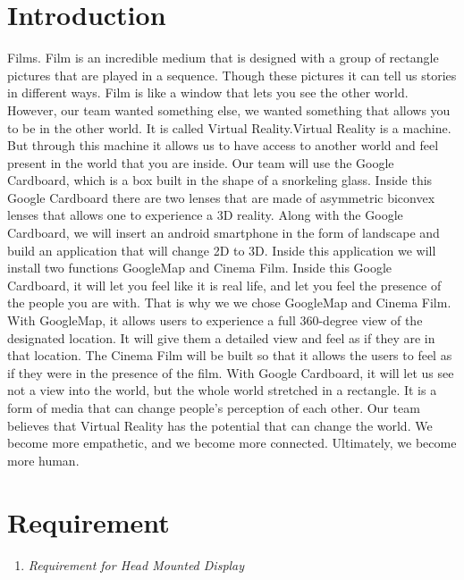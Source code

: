 \documentclass{article}
\begin{document}
\textbf{\textit{}}


\section{ Introduction}

\noindent Films. Film is an incredible medium that is designed with a group of rectangle pictures that are played in a sequence. Though these pictures it can tell us stories in different ways. Film is like a window that lets you see the other world. However, our team wanted something else, we wanted something that allows you to be in the other world. It is called Virtual Reality.Virtual Reality is a machine. But through this machine it allows us to have access to another world and feel present in the world that you are inside. Our team will use the Google Cardboard, which is a box built in the shape of a snorkeling glass. Inside this Google Cardboard there are two lenses that are made of asymmetric biconvex lenses that allows one to experience a 3D reality. Along with the Google Cardboard, we will insert an android smartphone in the form of landscape and build an application that will change 2D to 3D. Inside this application we will install two functions GoogleMap and Cinema Film. Inside this Google Cardboard, it will let you feel like it is real life, and let you feel the presence of the people you are with. That is why we we chose GoogleMap and Cinema Film. With GoogleMap, it allows users to experience a full 360-degree view of the designated location. It will give them a detailed view and feel as if they are in that location. The Cinema Film will be built so that it allows the users to feel as if they were in the presence of the film. With Google Cardboard, it will let us see not a view into the world, but the whole world stretched in a rectangle. It is a form of media that can change people's perception of each other. Our team believes that Virtual Reality has the potential that can change the world. We become more empathetic, and we become more connected. Ultimately, we become more human.


\section{ Requirement}

\noindent 

\begin{enumerate}
\item  \textit{Requirement for Head Mounted Display}
\end{enumerate}
\end{document}
